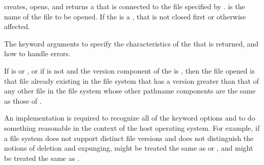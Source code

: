  creates, opens, and returns a  
that is connected to the file specified by .
 is the name of the file to be opened.  
If the   is a ,
that  is not closed first or otherwise affected.

The keyword arguments to  specify the characteristics 
of the  that is returned, and how to handle errors.

If  is 
or ,
or if  is not 
and the version component of the  is ,
then the file opened is that file already existing in the file system
that has a version greater than that of any other file in the file system
whose other pathname components are the same as those of .

An implementation is required to recognize all of 
the  keyword options 
and to do something reasonable in the context of the host operating
system.  
For example, if a file system does not support distinct file
versions and does not distinguish the notions of deletion and expunging,
 might be treated the same as
 or , and  might
be treated the same as .


